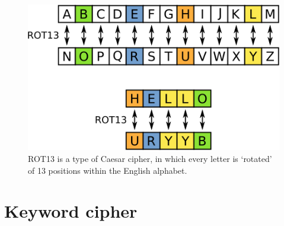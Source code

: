 \documentclass[Lau,binding=0.6cm,oneside]{sapthesis}
\begin{document}
\begin{figure}[h]
\includegraphics[scale=0.4]{rot13}
\captionsetup{justification=centering, margin=1.5cm}
\centering
\caption{\textsf{ROT13} is a type of Caesar cipher, in which every letter is `rotated' of 13 positions within the English alphabet.}
\centering
\end{figure}

\section{Keyword cipher}
\end{document}
